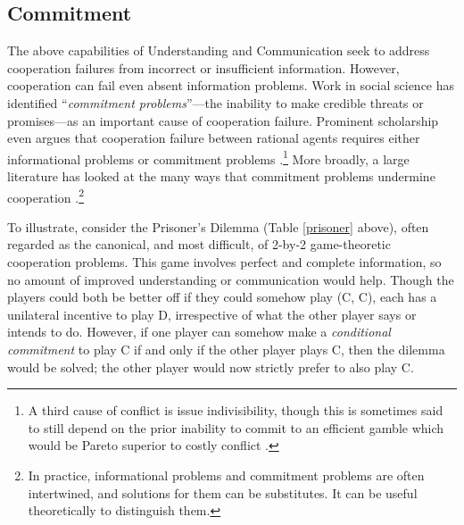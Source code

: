 \documentclass[11pt, a4paper, logo, onecolumn, nonumbering]{deepmind}
\begin{document}
\subsection{Commitment}
\label{section:commitment}




The above capabilities of Understanding and Communication seek to address cooperation failures from incorrect or insufficient information. However, cooperation can fail even absent information problems. Work in social science has identified ``\textit{commitment problems}''---the inability to make credible threats or promises---as an important cause of cooperation failure. Prominent scholarship even argues that cooperation failure between rational agents requires either informational problems or commitment problems \cite{fearon-rationalist, powell2006war}.\footnote{A third cause of conflict is issue indivisibility, though this is sometimes said to still depend on the prior inability to commit to an efficient gamble which would be Pareto superior to costly conflict \cite{powell2006war}.} More broadly, a large literature has looked at the many ways that commitment problems undermine cooperation \cite{sen1985goals, north1993institutions, fearon-rationalist, bagwell1995commitment, hovi1998games, hirshleifer2000game, powell2006war, garfinkel2007economics, jackson2011reasons}.\footnote{In practice, informational problems and commitment problems are often intertwined, and solutions for them can be substitutes. It can be useful theoretically to distinguish them.} 

To illustrate, consider the Prisoner's Dilemma (Table \ref{prisoner} above), often regarded as the canonical, and most difficult, of 2-by-2 game-theoretic cooperation problems. This game involves perfect and complete information, so no amount of improved understanding or communication would help. Though the players could both be better off if they could somehow play (C, C), each has a unilateral incentive to play D, irrespective of what the other player says or intends to do. However, if one player can somehow make a \textit{conditional commitment} to play C if and only if the other player plays C, then the dilemma would be solved; the other player would now strictly prefer to also play C.  
\end{document}
